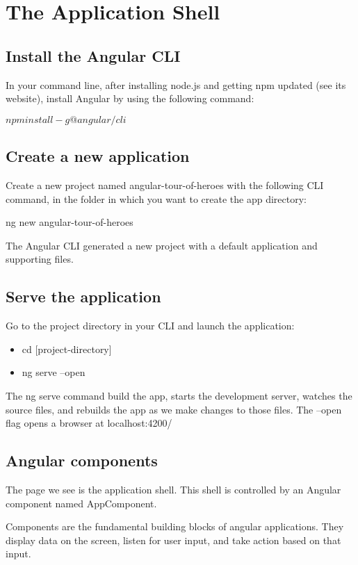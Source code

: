 \chapter{The Application Shell}
\section{Install the Angular CLI}
In your command line, after installing node.js and
getting npm updated (see its website), install
Angular by using the following command:

$npm install -g @angular/cli$

\section{Create a new application}
Create a new project named angular-tour-of-heroes with
the following CLI command, in the folder in which you
want to create the app directory:

ng new angular-tour-of-heroes

The Angular CLI generated a new project with a default
application and supporting files.

\section{Serve the application}
Go to the project directory in your CLI and launch the application:
\begin{itemize}
    \item cd [project-directory]
    \item ng serve --open
\end{itemize}

The ng serve command build the app, starts the development
server, watches the source files, and rebuilds the app as we
make changes to those files. The --open flag opens a browser
at localhost:4200/

\section{Angular components}
The page we see is the application shell. This shell is
controlled by an Angular component named AppComponent.

Components are the fundamental building blocks of angular
applications. They display data on the screen, listen for
user input, and take action based on that input.

